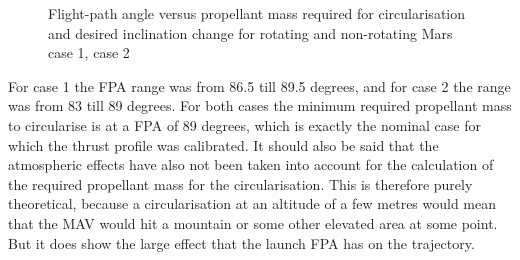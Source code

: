 \begin{figure}[H]
\centering
{} 
\caption{Flight-path angle versus propellant mass required for circularisation and desired inclination change for rotating and non-rotating Mars \protect{} case 1,  \protect{} case 2 } 
\label{fig:FPAvsPropellantMassCase1combined} 
\end{figure}

\noindent
For case 1 the \ac{FPA} range was from 86.5 till 89.5 degrees, and for case 2 the range was from 83 till 89 degrees. For both cases the minimum required propellant mass to circularise is at a \ac{FPA} of 89 degrees, which is exactly the nominal case for which the thrust profile was calibrated. It should also be said that the atmospheric effects have also not been taken into account for the calculation of the required propellant mass for the circularisation. This is therefore purely theoretical, because a circularisation at an altitude of a few metres would mean that the \ac{MAV} would hit a mountain or some other elevated area at some point. But it does show the large effect that the launch \ac{FPA} has on the trajectory.


